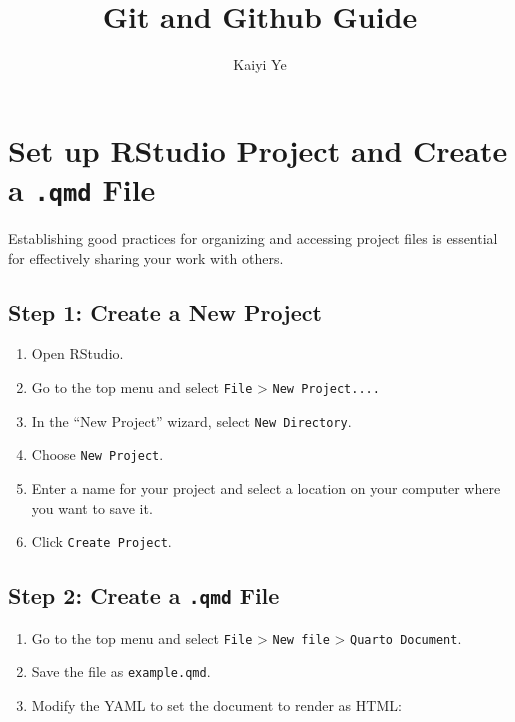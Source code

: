 \documentclass[
  11pt,
  letterpaper,
  DIV=11,
  numbers=noendperiod]{scrartcl}
\title{Git and Github Guide}
\author{Kaiyi Ye}
\date{}
\providecommand{\tightlist}{%
  \setlength{\itemsep}{0pt}\setlength{\parskip}{0pt}}\usepackage{longtable,booktabs,array}
\let\textttOrig\texttt
\renewcommand{\texttt}[1]{\textttOrig{\colorbox{codebggray}{\textcolor{codefontcolor}{#1}}}}
\renewcommand*\contentsname{Table of contents}
\newcommand\contentsname{Table of contents}
\begin{document}
\maketitle

\renewcommand*\contentsname{Table of contents}
{
\hypersetup{linkcolor=}
\setcounter{tocdepth}{3}
\tableofcontents
}

\section{\texorpdfstring{Set up RStudio Project and Create a
\texttt{.qmd}
File}{Set up RStudio Project and Create a .qmd File}}\label{set-up-rstudio-project-and-create-a-.qmd-file}

Establishing good practices for organizing and accessing project files
is essential for effectively sharing your work with others.

\subsection{Step 1: Create a New
Project}\label{step-1-create-a-new-project}

\begin{enumerate}
\def\labelenumi{\arabic{enumi}.}
\tightlist
\item
  Open RStudio.
\item
  Go to the top menu and select \texttt{File} \textgreater{}
  \texttt{New\ Project....}
\item
  In the ``New Project'' wizard, select \texttt{New\ Directory}.
\item
  Choose \texttt{New\ Project}.
\item
  Enter a name for your project and select a location on your computer
  where you want to save it.
\item
  Click \texttt{Create\ Project}.
\end{enumerate}

\subsection{\texorpdfstring{Step 2: Create a \texttt{.qmd}
File}{Step 2: Create a .qmd File}}\label{step-2-create-a-.qmd-file}

\begin{enumerate}
\def\labelenumi{\arabic{enumi}.}
\tightlist
\item
  Go to the top menu and select \texttt{File} \textgreater{}
  \texttt{New\ file} \textgreater{} \texttt{Quarto\ Document}.
\item
  Save the file as \texttt{example.qmd}.
\item
  Modify the YAML to set the document to render as HTML:
\end{enumerate}
\end{document}
